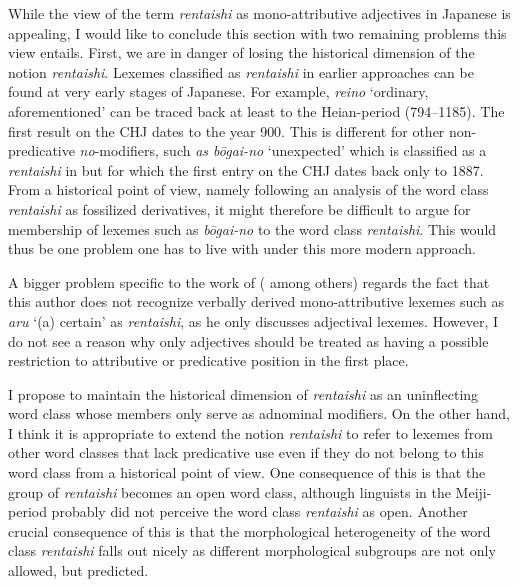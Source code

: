 \documentclass[output=paper,colorlinks,citecolor=brown]{langscibook}
\begin{document}
While the view of the term \emph{rentaishi} as mono-attributive adjectives in Japanese is appealing, I would like to conclude this section with two remaining problems this view entails. First, we are in danger of losing the historical dimension of the notion \emph{rentaishi}. Lexemes classified as \emph{rentaishi} in earlier approaches can be found at very early stages of Japanese. For example, \emph{reino} `ordinary, aforementioned' can be traced back at least to
the Heian-period (794--1185). The first result on the CHJ dates to the year 900. This is different for other non-predicative \emph{no}-modifiers, such \emph{as bōgai-no} `unexpected' which is classified as a \emph{rentaishi} in \citet{abekitazawaliu2022} but for which the first entry on the CHJ dates back only to 1887. From a historical point of view, namely following an analysis of the word class \emph{rentaishi} as fossilized derivatives, it might therefore be difficult to argue for membership of lexemes such as \emph{bōgai-no} to the word class \emph{rentaishi}. This would thus be one problem one has to live with under this more modern approach.

A bigger problem specific to the work of \citeauthor{muraki2012} (\citeyear{muraki2012} among others) regards the fact that this author does not recognize verbally derived mono-attributive lexemes such as \emph{aru} `(a) certain' as \emph{rentaishi}, as he only discusses adjectival lexemes. However, I do not see a reason why only adjectives should be treated as having a possible restriction to attributive or predicative position in the first place.

I propose to maintain the historical dimension of \emph{rentaishi} as an uninflecting word class whose members only serve as adnominal modifiers. On the other hand, I think it is appropriate to extend the notion \emph{rentaishi} to refer to lexemes from other word classes that lack predicative use even if they do not belong to this word class from a historical point of view. One consequence of this is that the group of \emph{rentaishi} becomes an open word class, although linguists in the Meiji-period probably did not perceive the word class \emph{rentaishi} as open. Another crucial consequence of this is that the morphological heterogeneity of the word class \emph{rentaishi} falls out nicely as different morphological subgroups are not only allowed, but predicted.
\end{document}
